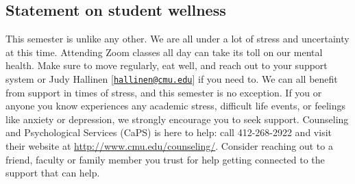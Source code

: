 \documentclass{article}
\begin{document}
\subsection*{Statement on student wellness}

This semester is unlike any other. We are all under a lot of stress and
uncertainty at this time. Attending Zoom classes all day can take its toll on
our mental health. Make sure to move regularly, eat well, and reach out to your
support system or Judy Hallinen
[\href{mailto:hallinen@cmu.edu}{\texttt{hallinen@cmu.edu}}] if you need to. We
can all benefit from support in times of stress, and this semester is no
exception. If you or anyone you know experiences any academic stress, difficult
life events, or feelings like anxiety or depression, we strongly encourage you
to seek support. Counseling and Psychological Services (CaPS) is here to help:
call 412-268-2922 and visit their website at
\url{http://www.cmu.edu/counseling/}. Consider reaching out to a friend, faculty
or family member you trust for help getting connected to the support that can
help.
\end{document}
